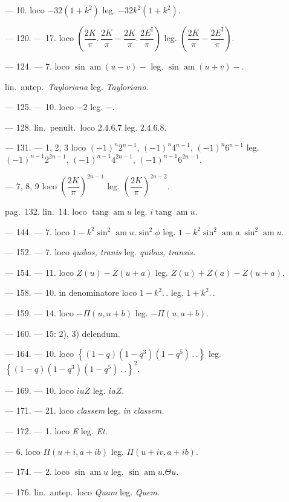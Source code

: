 \documentclass{article}
\begin{document}
--- 10. loco $-32(1+k^{2})$ leg. $-32k^{2}(1+k^{2})$.

--- 120. --- 17. loco $\left(\dfrac{2K}{\pi}.\,\dfrac{2K}{\pi}-\dfrac{2K}{\pi}.\,\dfrac{2E^{\mathrm{I}}}{\pi}\right)$ leg. $\left(\dfrac{2K}{\pi}-\dfrac{2E^{\mathrm{I}}}{\pi}\right)$.

--- 124. --- 7. loco $\sin\operatorname{am}(u-v)-$ leg. $\sin\operatorname{am}(u+v)-$.

lin.\ antep.\ \emph{Tayloriana} leg. \emph{Tayloriano}.

--- 125. --- 10. loco $-2$ leg. $-$.

--- 128. lin.\ penult.\ loco $2.4.6.7$ leg. $2.4.6.8$.

--- 131. --- 1, 2, 3 loco $(-1)^{n}2^{n-1}$, $(-1)^{n}4^{n-1}$, $(-1)^{n}6^{n-1}$ leg. $(-1)^{n-1}2^{2n-1}$, $(-1)^{n-1}4^{2n-1}$, $(-1)^{n-1}6^{2n-1}$.

--- 7, 8, 9 loco $\left(\dfrac{2K}{\pi}\right)^{2n-1}$ leg. $\left(\dfrac{2K}{\pi}\right)^{2n-2}$.


pag.\ 132. lin.\ 14. loco $\operatorname{tang}\operatorname{am}u$ leg. $i\operatorname{tang}\operatorname{am}u$.

--- 144. --- 7. loco $1-k^{2}\sin^{2}\operatorname{am}u.\sin^{2}\phi$ leg. $1-k^{2}\sin^{2}\operatorname{am}a.\sin^{2}\operatorname{am}u$.

--- 152. --- 7. loco \emph{quibos, tranis} leg. \emph{quibus, transis.}

--- 154. --- 11. loco $Z(u)-Z(u+a)$ leg. $Z(u)+Z(a)-Z(u+a)$.

--- 158. --- 10. in denominatore loco $1-k^{2}.\,.$ leg. $1+k^{2}.\,.$

--- 159. --- 14. loco $-\Pi(u,u+b)$ leg. $-\Pi(u,a+b)$.

--- 160. --- 15: 2), 3) delendum.

--- 164. --- 10. loco $\left\{(1-q)(1-q^{3})(1-q^{5})\,.\,.\right\}$ leg. $\left\{(1-q)(1-q^{3})(1-q^{5})\,.\,.\right\}^{2}$.

--- 169. --- 10. loco $iuZ$ leg. $iaZ$.

--- 171. --- 21. loco \emph{classem} leg. \emph{in classem.}

--- 172. --- 1. loco \emph{E} leg. \emph{Et.}

--- 6. loco $\Pi(u+i,a+ib)$ leg. $\Pi(u+iv,a+ib)$.

--- 174. --- 2. loco $\sin\operatorname{am}u$ leg. $\sin\operatorname{am}u.\Theta u$.

--- 176. lin.\ antep.\ loco \emph{Quam} leg. \emph{Quem.}
\end{document}
